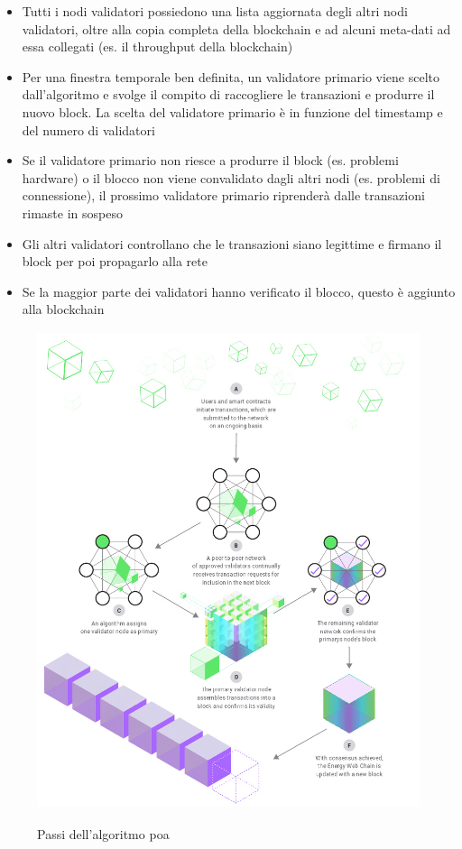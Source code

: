 \documentclass[12pt, letterpaper, twoside]{article}
\begin{document}
\begin{itemize}
    \item Tutti i nodi validatori possiedono una lista aggiornata degli altri nodi validatori, oltre alla copia completa della blockchain e ad alcuni meta-dati ad essa collegati (es. il throughput della blockchain)
    \item Per una finestra temporale ben definita, un validatore primario viene scelto dall'algoritmo e svolge il compito di raccogliere le transazioni e produrre il nuovo block. La scelta del validatore primario è in funzione del timestamp e del numero di validatori
    \item Se il validatore primario non riesce a produrre il block (es. problemi hardware) o il blocco non viene convalidato dagli altri nodi (es. problemi di connessione), il prossimo validatore primario riprenderà dalle transazioni rimaste in sospeso
    \item Gli altri validatori controllano che le transazioni siano legittime e firmano il block per poi propagarlo alla rete
    \item Se la maggior parte dei validatori hanno verificato il blocco, questo è aggiunto alla blockchain
\end{itemize}

\newpage

\begin{figure}[!h]
    \includegraphics[height=14cm,keepaspectratio]{ew-poa.jpg}
    \centering
    \label{ew-poa}
    \caption{Passi dell'algoritmo \gls{poa} \cite{img:ew-poa}}
\end{figure}
\end{document}

